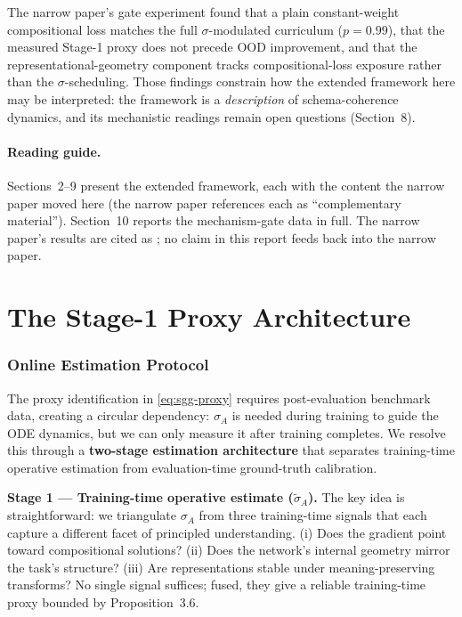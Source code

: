 \documentclass[11pt]{article}
\theoremstyle{definition}
\theoremstyle{plain}
\begin{document}
The narrow paper's gate experiment found that a plain constant-weight
compositional loss matches the full $\sigma$-modulated curriculum
($p = 0.99$), that the measured Stage-1 proxy does not precede OOD
improvement, and that the representational-geometry component tracks
compositional-loss exposure rather than the $\sigma$-scheduling. Those
findings constrain how the extended framework here may be interpreted:
the framework is a \emph{description} of schema-coherence dynamics, and
its mechanistic readings remain open questions (Section~8).

\paragraph*{Reading guide.}
Sections~2--9 present the extended framework, each with the content the
narrow paper moved here (the narrow paper references each as
``complementary material''). Section~10 reports the mechanism-gate data
in full. The narrow paper's results are cited as
\cite{sigmaTrap2026narrow}; no claim in this report feeds back into the
narrow paper.

\section{The Stage-1 Proxy Architecture}\label{sec:proxy}
\subsubsection{Online Estimation Protocol}\label{sec:online-estimation}

The proxy identification in \eqref{eq:sgg-proxy} requires
post-evaluation benchmark data, creating a circular dependency: $\sigma_A$ %
is needed during training to guide the ODE dynamics, but we can only measure it after training completes. We resolve this through a \textbf{two-stage
estimation architecture} that separates training-time operative estimation
from evaluation-time ground-truth calibration.

\textbf{Stage 1 --- Training-time operative estimate ($\tilde{\sigma}_A$).}
The key idea is straightforward: we triangulate $\sigma_A$ from three
training-time signals that each capture a different facet of principled
understanding. (i) Does the gradient point toward compositional solutions?
(ii) Does the network's internal geometry mirror the task's structure?
(iii) Are representations stable under meaning-preserving transforms?
No single signal suffices; fused, they give a reliable training-time proxy
bounded by Proposition~3.6.
\end{document}

